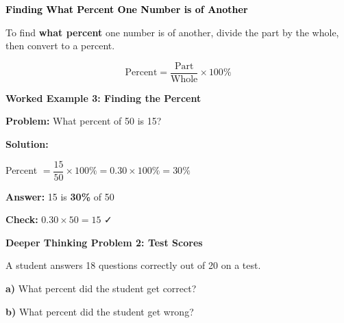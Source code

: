 \documentclass[12pt, letterpaper, fleqn]{article}
\begin{document}
\newpage

\begin{tcolorbox}[colback=customteal!20]
\large\textcolor{black}{\textbf{Finding What Percent One Number is of Another}}
\end{tcolorbox}

\noindent
To find \textbf{what percent} one number is of another, divide the part by the whole, then convert to a percent.

$$\text{Percent} = \dfrac{\text{Part}}{\text{Whole}} \times 100\%$$

\vspace{3mm}

\begin{tcolorbox}[colback=white, colframe=black!25, boxrule=0.6pt, arc=4mm, left=6mm, right=6mm, top=5mm, bottom=5mm]

\textbf{Worked Example 3: Finding the Percent}

\medskip

\textbf{Problem:} What percent of 50 is 15?

\medskip

\noindent
\textbf{Solution:}

\medskip

\noindent
Percent $= \dfrac{15}{50} \times 100\% = 0.30 \times 100\% = 30\%$

\medskip

\noindent
\textbf{Answer:} 15 is \textbf{30\%} of 50

\medskip

\noindent
\textbf{Check:} $0.30 \times 50 = 15$ ✓

\end{tcolorbox}

\vspace{4mm}

\begin{tcolorbox}[colback=yellow!15, colframe=orange, boxrule=1.5pt, arc=4mm, left=6mm, right=6mm, top=5mm, bottom=5mm]

\textbf{Deeper Thinking Problem 2: Test Scores}

\medskip

\noindent
A student answers 18 questions correctly out of 20 on a test.

\noindent
\textbf{a)} What percent did the student get correct?

\vspace{1.8cm}

\noindent
\textbf{b)} What percent did the student get wrong?

\vspace{1.8cm}

\end{tcolorbox}
\end{document}

